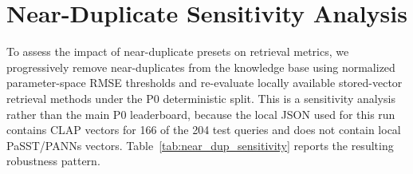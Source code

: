\documentclass{article}
\begin{document}
\section{Near-Duplicate Sensitivity Analysis}

To assess the impact of near-duplicate presets on retrieval metrics, we progressively remove near-duplicates from the knowledge base using normalized parameter-space RMSE thresholds and re-evaluate locally available stored-vector retrieval methods under the P0 deterministic split. This is a sensitivity analysis rather than the main P0 leaderboard, because the local JSON used for this run contains CLAP vectors for 166 of the 204 test queries and does not contain local PaSST/PANNs vectors. Table~\ref{tab:near_dup_sensitivity} reports the resulting robustness pattern.

\begin{table}[htbp]
	\centering
	\caption{Near-duplicate sensitivity analysis under normalized parameter-space RMSE deduplication. KB size decreases as the threshold $\tau$ increases. Param.\,Dist.\,$\downarrow$; all other metrics $\uparrow$.}
	\label{tab:near_dup_sensitivity}
	\small
\end{table}
\end{document}
